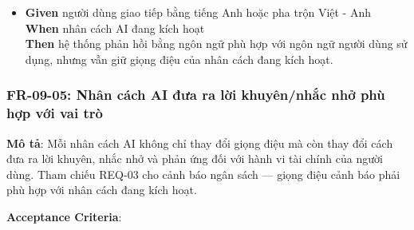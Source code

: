 \begin{itemize}
\item \textbf{Given} người dùng giao tiếp bằng tiếng Anh hoặc pha trộn Việt - Anh  \\ \hspace*{1.5em}  \textbf{When} nhân cách AI đang kích hoạt  \\ \hspace*{1.5em}  \textbf{Then} hệ thống phản hồi bằng ngôn ngữ phù hợp với ngôn ngữ người dùng sử dụng, nhưng vẫn giữ giọng điệu của nhân cách đang kích hoạt.
\end{itemize}
\subsubsection{FR-09-05: Nhân cách AI đưa ra lời khuyên/nhắc nhở phù hợp với vai trò}

\textbf{Mô tả}: Mỗi nhân cách AI không chỉ thay đổi giọng điệu mà còn thay đổi cách đưa ra lời khuyên, nhắc nhở và phản ứng đối với hành vi tài chính của người dùng. Tham chiếu REQ-03 cho cảnh báo ngân sách — giọng điệu cảnh báo phải phù hợp với nhân cách đang kích hoạt.



\textbf{Acceptance Criteria}:

